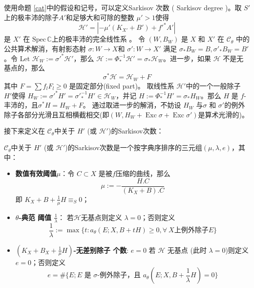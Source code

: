 使用命题 \ref{cat}中的假设和记号，可以定义Sarkisov 次数 ( Sarkisov degree )。取 $S'$ 上的极丰沛的除子$ A'  $和足够大和可除的整数 $ \mu'>1 $使得
\[ \mathcal{H}'=|-\mu' (K_{X'}+B') +f'^*A'| \]
是 $ X' $ 在 $ \mathrm{Spec}\,\mathbb{C}$上的极丰沛的完全线性系 。 令 $ (W,B_W) $ 是 $ X $ 和 $ X' $ 在 $ \mathcal{C}_\theta $ 中的公共算术解消，有射影态射 $ \sigma:W\to X$和   $\sigma':W\to X' $ 满足 $\sigma_*B_W=B, \sigma'_*B_W=B' $。令 Let $\mathcal{H}_W:=\sigma'^*\mathcal{H}'$，那么  $\mathcal{H}:=\Phi^{-1}_*\mathcal{H}'=\sigma_*\mathcal{H}_W$。进一步，如果 $ \mathcal{H} $ 不是无基点的，那么
\[ \sigma^*\mathcal{H}=\mathcal{H}_W+F \]
其中 $ F=\sum f_lF_l\geqslant0 $ 是固定部分(fixed part)。 取线性系 $ \mathcal{H}' $中的一个一般除子 $H'$使得 $ H_W:=\sigma'^*H'=\sigma'^{-1}_*H'\in \mathcal{H}_W $，并记 $ H:=\Phi^{-1}_*H'=\sigma_*H_{W} $。那么 $H$ 是 $f$-丰沛的，且$ \sigma^*H=H_W+F $。 通过取进一步的解消，不妨设 $H_{W}$ 与$\sigma$ 和 $\sigma'$的例外除子各部分光滑且互相横截相交(即$(W,H_{W}+ \operatorname{Exc}\sigma+ \operatorname{Exc}\sigma')$是算术光滑的)。


接下来定义在 $\mathcal{C}_{\theta}$中关于 $H'$ (或 $\mathcal{H}'$)的Sarkisov次数：
\begin{definition}\label{sarkisovdegree}
  \cite[Definition 3.8]{brunoLogSarkisovProgram1995}
 $\mathcal{C}_{\theta}$中关于 $H'$ (或 $\mathcal{H}'$)的Sarkisov次数是一个按字典序排序的三元组$ (\mu,\lambda,e) $，其中：
  \begin{itemize}
    \item \textbf{ 数值有效阈值$ \mu $}：令 $ C\subset X  $ 是被$ f $压缩的曲线，那么
          \[ \mu:=-\frac{H.C}{(K_X+B).C} \]
          即 $ K_X+B+\frac{1}{\mu} H \equiv_S0$；
    \item \textbf{$ \theta $-典范 阈值  $ \frac{1}{\lambda} $}：  若$ \mathcal{H} $无基点则定义 $\lambda=0$；否则定义
          \[ \frac{1}{\lambda}:=\max\{t:a_{\theta}(E;X,B+tH)\geqslant 0,  \forall \ X\text{上例外除子}E \}\]
    \item \textbf{ $(K_{X}+B_{X}+\frac{1}{\mu}H)$-无差别除子 个数}:  $ e=0 $ 若 $ \mathcal{H} $ 无基点 (此时 $ \lambda=0 $)则定义  $e=0$；否则定义
          \[ e=\#\{E; E \text{ 是 }\sigma\text{-例外除子，且 } a_{\theta}(E;X,B+\frac{1}{\lambda} H)=0 \} \]
  \end{itemize}
\end{definition}

